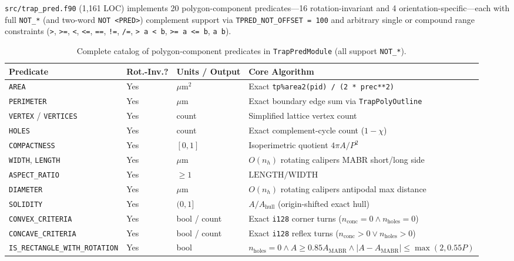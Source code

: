 \texttt{src/trap\_pred.f90} (1,161 LOC) implements 20 polygon-component predicates---16 rotation-invariant and 4 orientation-specific---each with full \texttt{NOT\_*} (and two-word \texttt{NOT <PRED>}) complement support via \texttt{TPRED\_NOT\_OFFSET = 100} and arbitrary single or compound range constraints (\texttt{>}, \texttt{>=}, \texttt{<}, \texttt{<=}, \texttt{==}, \texttt{!=}, \texttt{/=}, \texttt{> a < b}, \texttt{>= a <= b}, \texttt{a b}).

\begin{table}[htbp]
\centering
\caption{Complete catalog of polygon-component predicates in \texttt{TrapPredModule} (all support \texttt{NOT\_*}).}
\label{tab:predicates}
\small
\begin{tabular}{@{}llll@{}}
\toprule
\textbf{Predicate} & \textbf{Rot.-Inv.?} & \textbf{Units / Output} & \textbf{Core Algorithm} \\
\midrule
\texttt{AREA} & Yes & $\mu\text{m}^2$ & Exact \texttt{tp\%area2(pid) / (2 * prec**2)} \\
\texttt{PERIMETER} & Yes & $\mu\text{m}$ & Exact boundary edge sum via \texttt{TrapPolyOutline} \\
\texttt{VERTEX} / \texttt{VERTICES} & Yes & count & Simplified lattice vertex count \\
\texttt{HOLES} & Yes & count & Exact complement-cycle count ($1 - \chi$) \\
\texttt{COMPACTNESS} & Yes & $[0,1]$ & Isoperimetric quotient $4\pi A / P^2$ \\
\texttt{WIDTH}, \texttt{LENGTH} & Yes & $\mu\text{m}$ & $O(n_h)$ rotating calipers MABR short/long side \\
\texttt{ASPECT\_RATIO} & Yes & $\ge 1$ & $\text{LENGTH} / \text{WIDTH}$ \\
\texttt{DIAMETER} & Yes & $\mu\text{m}$ & $O(n_h)$ rotating calipers antipodal max distance \\
\texttt{SOLIDITY} & Yes & $(0,1]$ & $A / A_{\text{hull}}$ (origin-shifted exact hull) \\
\texttt{CONVEX\_CRITERIA} & Yes & bool / count & Exact \texttt{i128} corner turns ($n_{\text{conc}} = 0 \land n_{\text{holes}} = 0$) \\
\texttt{CONCAVE\_CRITERIA} & Yes & bool / count & Exact \texttt{i128} reflex turns ($n_{\text{conc}} > 0 \lor n_{\text{holes}} > 0$) \\
\texttt{IS\_RECTANGLE\_WITH\_ROTATION} & Yes & bool & $n_{\text{holes}}=0 \land A \ge 0.85 A_{\text{MABR}} \land |A - A_{\text{MABR}}| \le \max(2, 0.55 P)$ \\

\end{tabular}
\end{table}
